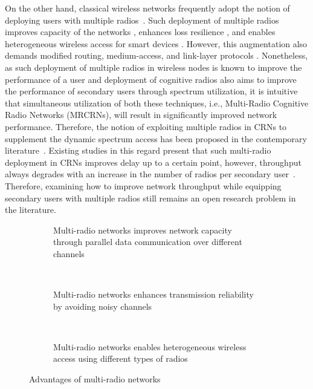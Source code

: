 
On the other hand, classical wireless networks frequently adopt the notion of deploying users with multiple radios~\cite{bahl2004reconsidering, adya2004multi}. Such deployment of multiple radios improves capacity of the networks \cite{draves2004routing, bahl2004reconsidering}, enhances loss resilience \cite{miu2005improving}, and enables heterogeneous wireless access for smart devices \cite{song2012performance}. However, this augmentation also demands modified routing, medium-access, and link-layer protocols \cite{kyasanur2006routing, chatterjee2013low}. Nonetheless, as such deployment of multiple radios in wireless nodes is known to improve the performance of a user and  deployment of cognitive radios also aims to improve the performance of secondary users through spectrum utilization, it is intuitive that simultaneous utilization of both these techniques, i.e., Multi-Radio Cognitive Radio Networks (MRCRNs), will result in significantly improved network performance. Therefore, the notion of exploiting multiple radios in CRNs to supplement the dynamic spectrum access has been proposed in the contemporary literature~\cite{li2014deterministic, zhong2014capacity, khan2015towards}. Existing studies in this regard present that such multi-radio deployment in CRNs improves delay up to a certain point, however, throughput always degrades with an increase in the number of radios per secondary user~\cite{khan2015towards}. Therefore, examining how to improve network throughput while equipping secondary users with multiple radios still remains an open research problem in the literature.

\begin{figure}[!htbp]
    \centering
    \begin{subfigure}[t]{0.3\textwidth}
        
        \caption{Multi-radio networks improves network capacity through parallel data communication over different channels}
        \label{fig:improvedNetworkCapacity}
    \end{subfigure}
    ~
    \begin{subfigure}[t]{0.3\textwidth}
        
        \caption{Multi-radio networks enhances transmission reliability by avoiding noisy channels}
        \label{fig:enhancedLossResilence}
    \end{subfigure}
    ~
    \begin{subfigure}[t]{0.3\textwidth}
        
        \caption{Multi-radio networks enables heterogeneous wireless access using different types of radios}
        \label{fig:heterogenousAccess}
    \end{subfigure}
    \caption{Advantages of multi-radio networks}
    \label{fig:advMRN}
\end{figure}

